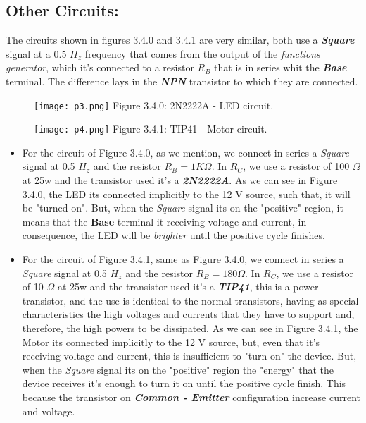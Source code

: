 \subsection{Other Circuits:}

The circuits shown in figures 3.4.0 and 3.4.1 are very similar, both use a {\bfseries\itshape Square} signal at a 0.5 $H_{z}$ frequency that comes from the output of the {\itshape functions generator}, which it's connected to a resistor $R_{B}$ that is in series whit the {\bfseries\itshape Base} terminal. The difference lays in the {\bfseries\itshape NPN} transistor to which they are connected.

\begin{multicols}{2}
\begin{figure}[H]
\texttt{[image: p3.png]}
\centering \linebreak \linebreak Figure 3.4.0:  2N2222A - LED circuit.
\end{figure}

\begin{figure}[H]
\texttt{[image: p4.png]}
\centering \linebreak \linebreak Figure 3.4.1: TIP41 - Motor circuit.
\end{figure}
\end{multicols}

\begin{itemize}
\item For the circuit of Figure 3.4.0, as we mention, we connect in series a {\itshape Square} signal at 0.5 $H_{z}$ and the resistor $R_{B} = 1K \Omega$. In $R_{C}$, we use a resistor of 100 $\Omega$ at 25w and the transistor used it's a {\bfseries\itshape 2N2222A}. As we can see in Figure 3.4.0, the LED its connected implicitly to the 12 V source, such that, it will be "turned on". But, when the {\itshape Square} signal its on the "positive" region, it means that the {\bfseries Base} terminal it receiving voltage and current, in consequence, the LED will be {\itshape brighter} until the positive cycle finishes. \hfill \break

\item For the circuit of Figure 3.4.1, same as Figure 3.4.0, we connect in series a {\itshape Square} signal at 0.5 $H_{z}$ and the resistor $R_{B} = 180 \Omega$. In $R_{C}$, we use a resistor of 10 $\Omega$ at 25w and the transistor used it's a {\bfseries\itshape TIP41}, this is a power transistor, and the use is identical to the normal transistors, having as special characteristics the high voltages and currents that they have to support and, therefore, the high powers to be dissipated. As we can see in Figure 3.4.1, the Motor its connected implicitly to the 12 V source, but, even that it's receiving voltage and current, this is insufficient to "turn on" the device. But, when the {\itshape Square} signal its on the "positive" region the "energy" that the device receives it's enough to turn it on until the positive cycle finish. This because the transistor on {\bfseries\itshape Common - Emitter} configuration increase current and voltage.
\end{itemize}

\pagebreak